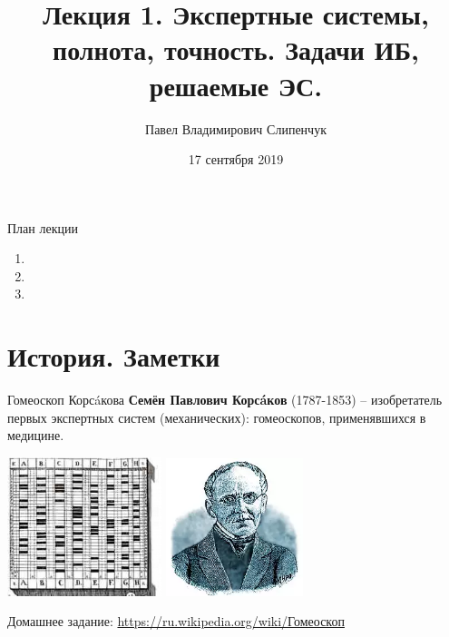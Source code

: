 


\title{Лекция 1. Экспертные системы, полнота, точность. Задачи ИБ, решаемые ЭС.}
\date{17 сентября 2019}
\author{Павел Владимирович Слипенчук}


  \maketitle
    
  \begin{frame}{План лекции}
    \begin{enumerate}
    \item {}
    \item {}
    \item {}
	\end{enumerate}
 \end{frame}
 
 \section{История. Заметки}\label{section:history_remarks}
  
  \begin{frame}{Гомеоскоп Корсáкова}
    \textbf{Семён Павлович Корсáков}
    (1787-1853) 
    -- изобретатель первых экспертных систем 
    (механических): гомеоскопов, применявшихся в медицине.  
    \begin{center}
    		\includegraphics[width=4.5cm]{../pic/gomeoskop.png}\centering
    		\includegraphics[width=4cm]{../pic/korsakov.png}\centering
    \end{center}
    Домашнее задание: \url{https://ru.wikipedia.org/wiki/Гомеоскоп}
  \end{frame}
  
